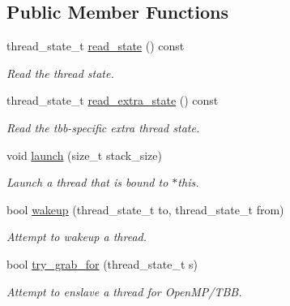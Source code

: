 \subsection*{Public Member Functions}
\begin{DoxyCompactItemize}
\item 
\hypertarget{classrml_1_1internal_1_1server__thread_a10e03c6181f78a147e6ff2194894b310}{}thread\+\_\+state\+\_\+t \hyperlink{classrml_1_1internal_1_1server__thread_a10e03c6181f78a147e6ff2194894b310}{read\+\_\+state} () const \label{classrml_1_1internal_1_1server__thread_a10e03c6181f78a147e6ff2194894b310}

\begin{DoxyCompactList}\small\item\em Read the thread state. \end{DoxyCompactList}\item 
\hypertarget{classrml_1_1internal_1_1server__thread_a5accc222b0d0857b253e010141466ac8}{}thread\+\_\+state\+\_\+t \hyperlink{classrml_1_1internal_1_1server__thread_a5accc222b0d0857b253e010141466ac8}{read\+\_\+extra\+\_\+state} () const \label{classrml_1_1internal_1_1server__thread_a5accc222b0d0857b253e010141466ac8}

\begin{DoxyCompactList}\small\item\em Read the tbb-\/specific extra thread state. \end{DoxyCompactList}\item 
\hypertarget{classrml_1_1internal_1_1server__thread_a0135b2871e6dedf3713ccc569896a786}{}void \hyperlink{classrml_1_1internal_1_1server__thread_a0135b2871e6dedf3713ccc569896a786}{launch} (size\+\_\+t stack\+\_\+size)\label{classrml_1_1internal_1_1server__thread_a0135b2871e6dedf3713ccc569896a786}

\begin{DoxyCompactList}\small\item\em Launch a thread that is bound to $\ast$this. \end{DoxyCompactList}\item 
bool \hyperlink{classrml_1_1internal_1_1server__thread_aa0be5031e71c0c2cf3a2998ddb386d37}{wakeup} (thread\+\_\+state\+\_\+t to, thread\+\_\+state\+\_\+t from)
\begin{DoxyCompactList}\small\item\em Attempt to wakeup a thread. \end{DoxyCompactList}\item 
bool \hyperlink{classrml_1_1internal_1_1server__thread_adbad2307bea52ab492350db05c37ac33}{try\+\_\+grab\+\_\+for} (thread\+\_\+state\+\_\+t s)
\begin{DoxyCompactList}\small\item\em Attempt to enslave a thread for Open\+M\+P/\+T\+B\+B. \end{DoxyCompactList}\end{DoxyCompactItemize}
